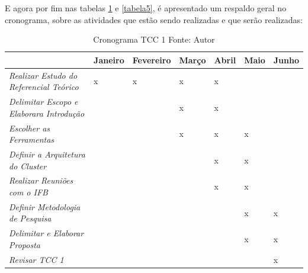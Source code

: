         E agora por fim nas tabelas \ref{tabela4} e \ref{tabela5}, é apresentado um respaldo geral no cronograma, sobre as
        atividades que estão sendo realizadas e que serão realizadas:

        \begin{table}[!ht]
            \begin{center}
              \begin{tabular}{|p{8cm}|p{1.3cm}|p{1.5cm}|p{1cm}|p{1cm}|p{1cm}|p{1cm}|}
                \hline
                \centering{Atividades} & Janeiro & Fevereiro & Março & Abril & Maio & Junho
                \\ \hline
                \textit{Realizar Estudo do Referencial Teórico} & x & x & x & x & &
                \\ \hline
                \textit{Delimitar Escopo e Elaborara Introdução}& & & x & x & &
                \\ \hline
                \textit{Escolher as Ferramentas} & & & x & x & x &
                \\ \hline
                \textit{Definir a Arquitetura do Cluster} & & & & x & x &
                \\ \hline
                \textit{Realizar Reuniões com o IFB} & & & & x & x &
                \\ \hline
                \textit{Definir Metodologia de Pesquisa} & & & & & x & x
                \\ \hline
                \textit{Delimitar e Elaborar Proposta} & & & & & x & x
                \\ \hline
                \textit{Revisar TCC 1} & & & & & & x
                \\ \hline
              \end{tabular}
              \caption[Cronograma TCC 1]{Cronograma TCC 1
              \protect \linebreak Fonte: Autor}
            \label{tabela4}
            \end{center}
        \end{table}

